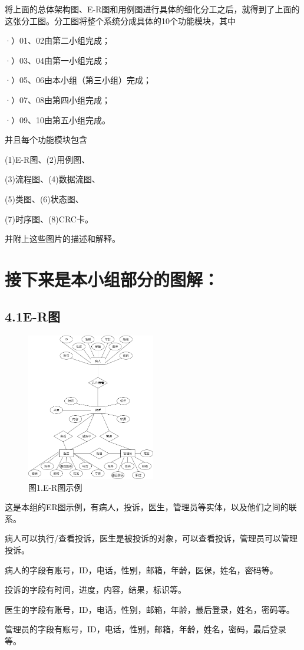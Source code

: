 \documentclass[24pt,a4paper]{article}%
\begin{document}
将上面的总体架构图、E-R图和用例图进行具体的细化分工之后，就得到了上面的这张分工图。分工图将整个系统分成具体的10个功能模块，其中\par
·）01、02由第二小组完成；\par
·）03、04由第一小组完成；\par
·）05、06由本小组（第三小组）完成；\par
·）07、08由第四小组完成；\par
·）09、10由第五小组完成。\par
并且每个功能模块包含\par \quad \quad(1)E-R图、(2)用例图、\par \quad \quad(3)流程图、(4)数据流图、\par \quad \quad(5)类图、(6)状态图、\par \quad \quad(7)时序图、(8)CRC卡。\par 并附上这些图片的描述和解释。
\newpage

\section*{\songti 接下来是本小组部分的图解：}
\subsection*{\songti 4.1E-R图}
\begin{figure}[H]
    \centering
    \includegraphics[width=0.5\textwidth]{images/ERGraph.png}
    \caption*{图1.E-R图示例}
\end{figure}
这是本组的ER图示例，有病人，投诉，医生，管理员等实体，以及他们之间的联系。\par
病人可以执行/查看投诉，医生是被投诉的对象，可以查看投诉，管理员可以管理投诉。\par
病人的字段有账号，ID，电话，性别，邮箱，年龄，医保，姓名，密码等。\par
投诉的字段有时间，进度，内容，结果，标识等。\par
医生的字段有账号，ID，电话，性别，邮箱，年龄，最后登录，姓名，密码等。\par
管理员的字段有账号，ID，电话，性别，邮箱，年龄，姓名，密码，最后登录等。\par
\end{document}
